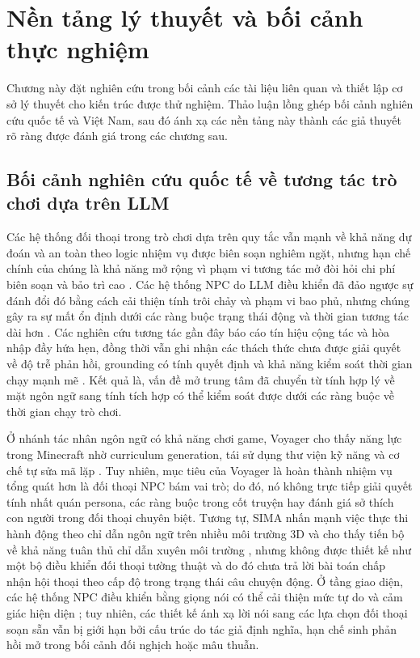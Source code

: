 ﻿\documentclass[a4paper,12pt]{article}
\begin{document}
\section{Nền tảng lý thuyết và bối cảnh thực nghiệm}
Chương này đặt nghiên cứu trong bối cảnh các tài liệu liên quan và thiết lập cơ sở lý thuyết cho kiến trúc được thử nghiệm. Thảo luận lồng ghép bối cảnh nghiên cứu quốc tế và Việt Nam, sau đó ánh xạ các nền tảng này thành các giả thuyết rõ ràng được đánh giá trong các chương sau.
\subsection{Bối cảnh nghiên cứu quốc tế về tương tác trò chơi dựa trên LLM}
Các hệ thống đối thoại trong trò chơi dựa trên quy tắc vẫn mạnh về khả năng dự đoán và an toàn theo logic nhiệm vụ được biên soạn nghiêm ngặt, nhưng hạn chế chính của chúng là khả năng mở rộng vì phạm vi tương tác mở đòi hỏi chi phí biên soạn và bảo trì cao \cite{Gallotta2024Survey,Sweetser2024Scoping}. Các hệ thống NPC do LLM điều khiển đã đảo ngược sự đánh đổi đó bằng cách cải thiện tính trôi chảy và phạm vi bao phủ, nhưng chúng gây ra sự mất ổn định dưới các ràng buộc trạng thái động và thời gian tương tác dài hơn \cite{Park2023GenerativeAgents,Gallotta2024Survey,Sweetser2024Scoping}. Các nghiên cứu tương tác gần đây báo cáo tín hiệu cộng tác và hòa nhập đầy hứa hẹn, đồng thời vẫn ghi nhận các thách thức chưa được giải quyết về độ trễ phản hồi, grounding có tính quyết định và khả năng kiểm soát thời gian chạy mạnh mẽ \cite{Rao2024Minecraft,Christiansen2024Presence}. Kết quả là, vấn đề mở trung tâm đã chuyển từ tính hợp lý về mặt ngôn ngữ sang tính tích hợp có thể kiểm soát được dưới các ràng buộc về thời gian chạy trò chơi.

Ở nhánh tác nhân ngôn ngữ có khả năng chơi game, Voyager cho thấy năng lực trong Minecraft nhờ curriculum generation, tái sử dụng thư viện kỹ năng và cơ chế tự sửa mã lặp \cite{Wang2023Voyager}. Tuy nhiên, mục tiêu của Voyager là hoàn thành nhiệm vụ tổng quát hơn là đối thoại NPC bám vai trò; do đó, nó không trực tiếp giải quyết tính nhất quán persona, các ràng buộc trong cốt truyện hay đánh giá sở thích con người trong đối thoại chuyên biệt. Tương tự, SIMA nhấn mạnh việc thực thi hành động theo chỉ dẫn ngôn ngữ trên nhiều môi trường 3D và cho thấy tiến bộ về khả năng tuân thủ chỉ dẫn xuyên môi trường \cite{DeepMind2024SIMA}, nhưng không được thiết kế như một bộ điều khiển đối thoại tường thuật và do đó chưa trả lời bài toán chấp nhận hội thoại theo cấp độ trong trạng thái câu chuyện động. Ở tầng giao diện, các hệ thống NPC điều khiển bằng giọng nói có thể cải thiện mức tự do và cảm giác hiện diện \cite{Wevelsiep2025Voice}; tuy nhiên, các thiết kế ánh xạ lời nói sang các lựa chọn đối thoại soạn sẵn vẫn bị giới hạn bởi cấu trúc do tác giả định nghĩa, hạn chế sinh phản hồi mở trong bối cảnh đối nghịch hoặc mâu thuẫn.
\end{document}
